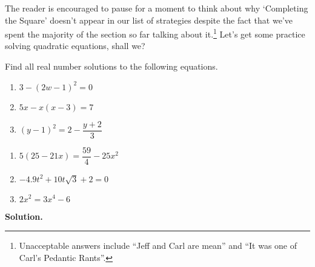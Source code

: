 \documentclass{ximera}
\begin{document}
{{{{{%

\medskip

The reader is encouraged to pause for a moment to think about why `Completing the Square' doesn't appear in our list of strategies despite the fact that we've spent the majority of the section so far talking about it.\footnote{Unacceptable answers include ``Jeff and Carl are mean'' and ``It was one of Carl's Pedantic Rants''.}  Let's get some practice solving quadratic equations, shall we?

\begin{example}\label{reviewquadraticex}  Find all real number solutions to the following equations.

\begin{multicols}{3}

\begin{enumerate}

\item $3 - (2w-1)^2 = 0$

\item $5x - x(x-3) = 7$

\item  $(y-1)^2 = 2 - \dfrac{y+2}{3}$ 

\setcounter{HW}{\value{enumi}}

\end{enumerate}
\end{multicols}

\begin{multicols}{3}

\begin{enumerate}

\setcounter{enumi}{\value{HW}}

\item $5(25 - 21x) = \dfrac{59}{4} - 25x^2$

\item $-4.9t^2 + 10t\sqrt{3} + 2 = 0$ 



\item $2x^2 = 3x^4 - 6$



\setcounter{HW}{\value{enumi}}

\end{enumerate}
\end{multicols}

{\bf Solution.}


\end{example}}}}}}
\end{document}
